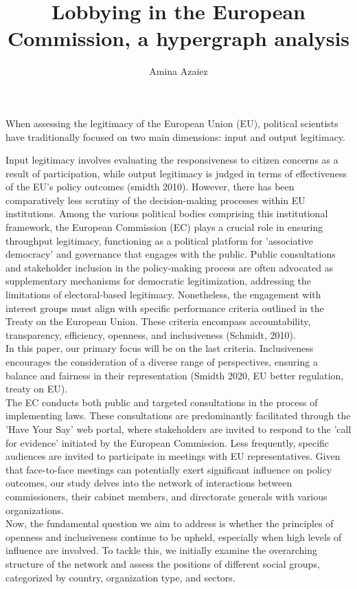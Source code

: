 \documentclass[ 11pt]{article}
\author[1]{Amina Azaiez}
\affil[1]{Université Paris 1 Panthéon-Sorbonne, Centre
d’économie de la Sorbonne, Maison des sciences économiques}
\title{Lobbying in the European Commission, a hypergraph analysis }
\begin{document}
\maketitle

When assessing the legitimacy of the European Union (EU), political scientists have traditionally focused on two main dimensions: input and output legitimacy. 

Input legitimacy involves evaluating the responsiveness to citizen concerns as a result of participation, while output legitimacy 
is judged in terms of effectiveness of the EU's policy outcomes (smidth 2010). However, there has been comparatively less scrutiny of the decision-making processes within EU institutions.
Among the various political bodies comprising this institutional framework, the European Commission (EC) plays a crucial role in ensuring throughput legitimacy, functioning as a political platform for 'associative democracy' and governance that engages with the public.
Public consultations and stakeholder inclusion in the policy-making process are often advocated as supplementary mechanisms for democratic legitimization, addressing the limitations of electoral-based legitimacy.
Nonetheless, the engagement with interest groups must align with specific performance criteria outlined in the Treaty on the European Union. These criteria encompass accountability, transparency, efficiency, openness, and inclusiveness (Schmidt, 2010). \\
In this paper, our primary focus will be on the last criteria. Inclusiveness encourages the consideration of a diverse range of perspectives, ensuring a balance and fairness in their representation  (Smidth 2020, EU better regulation, treaty on EU). \\

The EC conducts both public and targeted consultations in the process of implementing laws. These consultations are predominantly facilitated through the 'Have Your Say' web portal, where stakeholders are invited to respond to the 'call for evidence' initiated by the European Commission. Less frequently, specific audiences are invited to participate in meetings with EU representatives. Given that face-to-face meetings can potentially exert significant influence on policy outcomes, our study delves into the network of interactions between commissioners, their cabinet members, and directorate generals with various organizations.\\

Now, the fundamental question we aim to address is whether the principles of openness and inclusiveness continue to be upheld, especially when high levels of influence are involved. To tackle this, we initially examine the overarching structure of the network and assess the positions of different social groups, categorized by country, organization type, and sectors.
\end{document}
